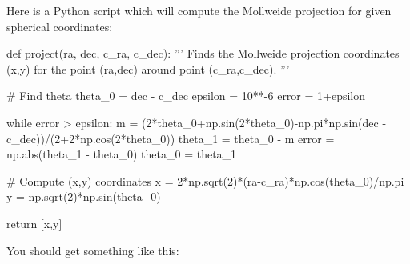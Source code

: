 \documentclass[paper=a4, fontsize=11pt]{scrartcl} %
\begin{document}
Here is a Python script which will compute the Mollweide projection for given spherical coordinates:
\begin{python}

def project(ra, dec, c_ra, c_dec):
	'''
	Finds the Mollweide projection coordinates (x,y) for the point (ra,dec) around 
	point (c_ra,c_dec).
	'''
	
	# Find theta
	theta_0 = dec - c_dec
	epsilon = 10**-6
	error = 1+epsilon
	
	while error > epsilon:
	    m = (2*theta_0+np.sin(2*theta_0)-np.pi*np.sin(dec - c_dec))/(2+2*np.cos(2*theta_0))
	    theta_1 = theta_0 - m
	    error = np.abs(theta_1 - theta_0)
	    theta_0 = theta_1
	
	# Compute (x,y) coordinates
	x = 2*np.sqrt(2)*(ra-c_ra)*np.cos(theta_0)/np.pi
	y = np.sqrt(2)*np.sin(theta_0)
	
	return [x,y]
\end{python}



You should get something like this:
\begin{figure}[!h]
\captionsetup{labelformat=empty}
\caption{}
\end{figure}
\end{document}
